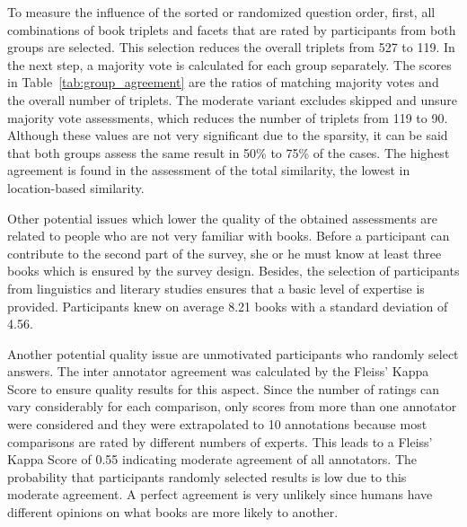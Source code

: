 \documentclass[11pt]{article}
\begin{document}
To measure the influence of the sorted or randomized question order, first, all combinations of book triplets and facets that are rated by participants from both groups are selected.
This selection reduces the overall triplets from 527 to 119.
In the next step, a majority vote is calculated for each group separately.
The scores in Table~\ref{tab:group_agreement} are the ratios of matching majority votes and the overall number of triplets.
The moderate variant excludes skipped and unsure majority vote assessments, which reduces the number of triplets from 119 to 90.
Although these values are not very significant due to the sparsity, it can be said that both groups assess the same result in 50\% to 75\% of the cases.
The highest agreement is found in the assessment of the total similarity, the lowest in location-based similarity.

Other potential issues which lower the quality of the obtained assessments are related to people who are not very familiar with books. 
Before a participant can contribute to the second part of the survey, she or he must know at least three books which is ensured by the survey design.
Besides, the selection of participants from linguistics and literary studies ensures that a basic level of expertise is provided.
Participants knew on average 8.21 books with a standard deviation of 4.56. 

Another potential quality issue are unmotivated participants who randomly select answers.
The inter annotator agreement was calculated by the Fleiss' Kappa Score to ensure quality results for this aspect.
Since the number of ratings can vary considerably for each comparison, only scores from more than one annotator were considered and they were extrapolated to 10 annotations because most comparisons are rated by different numbers of experts.
This leads to a Fleiss' Kappa Score of 0.55 indicating moderate agreement of all annotators.
The probability that participants randomly selected results is low due to this moderate agreement.
A perfect agreement is very unlikely since humans have different opinions on what books are more likely to another.
\end{document}
